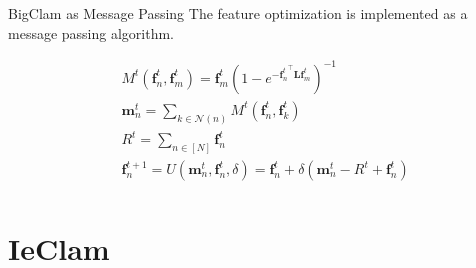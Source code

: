 \documentclass{beamer}
\newcommand{\sumgraph}{\underset{n \in [N]}{\sum}}
\begin{document}
\begin{frame}{BigClam as Message Passing}
    The feature optimization is implemented as a message passing algorithm.

\begin{equation}
\label{eqn:message passing bigclam}
\begin{aligned}
    &M^t(\mathbf{f}^t_n, \mathbf{f}^t_m) = \mathbf{f}^t_m\left(1-e^{-{\mathbf{f}^t_n}^\top \mathbf{L} \mathbf{f}^t_m}\right)^{-1} \\[1em]
    & \mathbf{m}^{t}_n = \underset{k\in \mathcal{N}(n)}{\sum}{M^t(\mathbf{f}^t_n,\mathbf{f}^t_k)} \\[1em]
    &R^t = \sumgraph \mathbf{f}^t_n \\[1em]
    &\mathbf{f}_n^{t+1} = U(\mathbf{m}^t_n, \mathbf{f}^t_n, \delta) = \mathbf{f}^t_n + \delta(\mathbf{m}^t_n - R^t + \mathbf{f}^t_n) \\
\end{aligned}
\end{equation}

\end{frame}

\section{IeClam}
\end{document}
